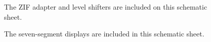 \documentclass[a4paper]{report}
\begin{document}
\begin{figure}[ht] 
  \centering
  {
   \setlength{\fboxsep}{0pt}
   \setlength{\fboxrule}{0pt}
  }
  \caption{The ZIF adapter and level shifters are included on this schematic sheet.}
  \label{fig:adapter_schematic}
\end{figure}

\begin{figure}[ht] 
  \centering
  {
   \setlength{\fboxsep}{0pt}
   \setlength{\fboxrule}{0pt}
  }
  \caption{The seven-segment displays are included in this schematic sheet.}
  \label{fig:7seg_schematic}
\end{figure}
\end{document}
